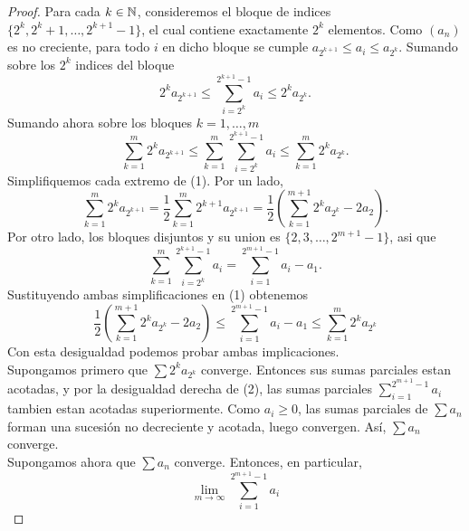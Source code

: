 \documentclass[12pt,a4paper]{article}
\newcommand{\paren}[1]{\left( #1 \right)}
\begin{document}
    \begin{proof}
        Para cada $k\in\mathbb{N}$, consideremos el bloque de indices $\{2^{k},2^{k}+1,\dots,2^{k+1}-1\}$,
        el cual contiene exactamente $2^{k}$ elementos. Como $(a_{n})$ es no creciente, para todo $i$
        en dicho bloque se cumple $a_{2^{k+1}}\leq a_{i}\leq a_{2^{k}}$. Sumando sobre los $2^{k}$ indices
        del bloque
        \begin{equation*}
            2^{k}a_{2^{k+1}}\leq\sum_{i=2^{k}}^{2^{k+1}-1}a_{i}\leq2^{k}a_{2^{k}}.
        \end{equation*}
        Sumando ahora sobre los bloques $k=1,\dots,m$
        \setcounter{equation}{0}
        \begin{equation}
            \sum_{k=1}^{m}2^{k}a_{2^{k+1}}\leq\sum_{k=1}^{m}\sum_{i=2^{k}}^{2^{k+1}-1}a_{i}\leq\sum_{k=1}^{m}2^{k}a_{2^{k}}.
        \end{equation}
        Simplifiquemos cada extremo de (1). Por un lado,
        \begin{equation*}
            \sum_{k=1}^{m}2^{k}a_{2^{k+1}}=\frac12\sum_{k=1}^{m}2^{k+1}a_{2^{k+1}}=\frac12\paren{\sum_{k=1}^{m+1}2^{k}a_{2^{k}}-2a_{2}}.
        \end{equation*}
        Por otro lado, los bloques disjuntos y su union es $\{2,3,\dots,2^{m+1}-1\}$, asi que
        \begin{equation*}
            \sum_{k=1}^{m}\sum_{i=2^{k}}^{2^{k+1}-1}a_{i}=\sum_{i=1}^{2^{m+1}-1}a_{i}-a_{1}.
        \end{equation*}
        Sustituyendo ambas simplificaciones en (1) obtenemos
        \begin{equation}
            \frac12\paren{\sum_{k=1}^{m+1}2^{k}a_{2^{k}}-2a_{2}}\leq\sum_{i=1}^{2^{m+1}-1}a_{i}-a_{1}\leq\sum_{k=1}^{m}2^{k}a_{2^{k}}
        \end{equation}
        Con esta desigualdad podemos probar ambas implicaciones.\\
        Supongamos primero que $\sum2^{k}a_{2^{k}}$ converge. Entonces sus sumas parciales estan acotadas,
        y por la desigualdad derecha de (2), las sumas parciales $\sum_{i=1}^{2^{m+1}-1}a_{i}$ tambien estan acotadas superiormente.
        Como $a_{i}\geq0$, las sumas parciales de $\sum a_{n}$ forman una sucesión no decreciente y acotada, luego convergen. Así,
        $\sum a_{n}$ converge.\\
        Supongamos ahora que $\sum a_{n}$ converge. Entonces, en particular,
        \begin{equation*}
            \lim_{m\to\infty}\sum_{i=1}^{2^{m+1}-1}a_{i}

\end{equation*}
\end{proof}
\end{document}
